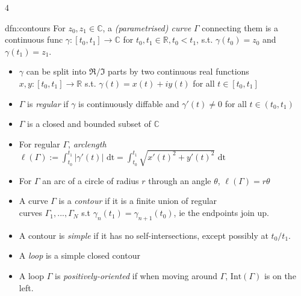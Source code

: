 \documentclass[landscape, 8pt]{extarticle}
\begin{document}
\begin{multicols*}{4}
	\begin{dfn}{dfn:contours}{ }
		For $z_0, z_1 \in \mathbb{C}$, a \textit{(parametrised) curve} $\Gamma$ connecting them is a continuous func $\gamma : [t_0, t_1] \to \mathbb{C}$ for $t_0, t_1 \in \mathbb{R}, t_0 < t_1$, s.t. $\gamma(t_0) = z_0$ and $\gamma(t_1) = z_1$.
		\begin{itemize}
			\item $\gamma$ can be split into $\Re/\Im$ parts by two continuous real functions $x, y : [t_0, t_1] \to \mathbb{R}$ s.t. $\gamma(t) = x(t) + iy(t)$ for all $t \in [t_0, t_1]$
			\item $\Gamma$ is \textit{regular} if $\gamma$ is continuously diffable and $\gamma'(t) \ne 0$ for all $t \in (t_0, t_1)$
			\item $\Gamma$ is a closed and bounded subset of $\mathbb{C}$
			\item For regular $\Gamma$, \textit{arclength} $\ell(\Gamma) := \int_{t_0}^{t_1}\left|\gamma'(t)\right| \text{ dt} = \int_{t_0}^{t_1} \sqrt{x'(t)^2 + y'(t)^2} \text{ dt}$
			\item For $\Gamma$ an arc of a circle of radius $r$ through an angle $\theta$, $\ell(\Gamma) = r\theta$
			\item A curve $\Gamma$ is a \textit{contour} if it is a finite union of regular\\
			curves $\Gamma_1, ..., \Gamma_N$ s.t $\gamma_n(t_1) = \gamma_{n+1}(t_0)$, ie the endpoints join up.
			\item A contour is \textit{simple} if it has no self-intersections, except possibly at $t_0/t_1$.
			\item A \textit{loop} is a simple closed contour
			\item A loop $\Gamma$ is \textit{positively-oriented} if when moving around $\Gamma$, $\text{Int}(\Gamma)$ is on the left.
		\end{itemize}
		
	\end{dfn}
	

\end{multicols*}
\end{document}
